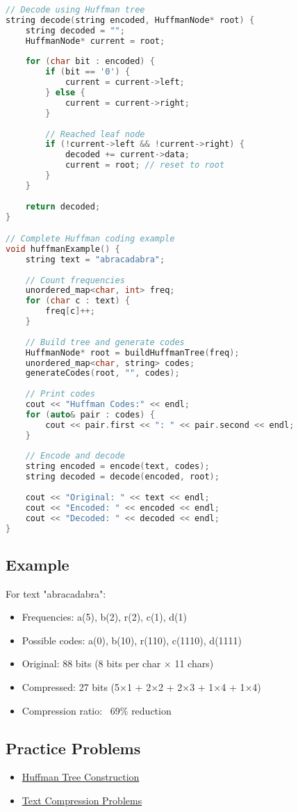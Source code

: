\documentclass[12pt]{article}
\begin{document}
\begin{lstlisting}[language=C++]
// Decode using Huffman tree
string decode(string encoded, HuffmanNode* root) {
    string decoded = "";
    HuffmanNode* current = root;
    
    for (char bit : encoded) {
        if (bit == '0') {
            current = current->left;
        } else {
            current = current->right;
        }
        
        // Reached leaf node
        if (!current->left && !current->right) {
            decoded += current->data;
            current = root; // reset to root
        }
    }
    
    return decoded;
}

// Complete Huffman coding example
void huffmanExample() {
    string text = "abracadabra";
    
    // Count frequencies
    unordered_map<char, int> freq;
    for (char c : text) {
        freq[c]++;
    }
    
    // Build tree and generate codes
    HuffmanNode* root = buildHuffmanTree(freq);
    unordered_map<char, string> codes;
    generateCodes(root, "", codes);
    
    // Print codes
    cout << "Huffman Codes:" << endl;
    for (auto& pair : codes) {
        cout << pair.first << ": " << pair.second << endl;
    }
    
    // Encode and decode
    string encoded = encode(text, codes);
    string decoded = decode(encoded, root);
    
    cout << "Original: " << text << endl;
    cout << "Encoded: " << encoded << endl;
    cout << "Decoded: " << decoded << endl;
}
\end{lstlisting}

\subsection{Example}
For text "abracadabra":
\begin{itemize}
    \item Frequencies: a(5), b(2), r(2), c(1), d(1)
    \item Possible codes: a(0), b(10), r(110), c(1110), d(1111)
    \item Original: 88 bits (8 bits per char × 11 chars)
    \item Compressed: 27 bits (5×1 + 2×2 + 2×3 + 1×4 + 1×4)
    \item Compression ratio: ~69\% reduction
\end{itemize}

\subsection{Practice Problems}
\begin{itemize}
    \item \href{https://leetcode.com/problems/minimum-number-of-taps-to-open-to-water-a-garden/}{Huffman Tree Construction}
    \item \href{https://codeforces.com/problemset/problem/1461/D}{Text Compression Problems}
\end{itemize}
\end{document}
